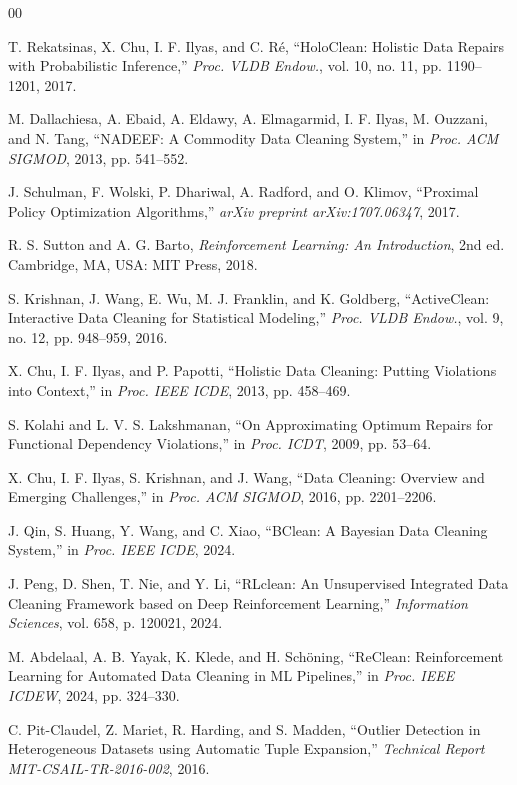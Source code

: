 \documentclass[sigconf]{acmart}
\begin{document}
\begin{thebibliography}{00}

T. Rekatsinas, X. Chu, I. F. Ilyas, and C. R\'{e},
``HoloClean: Holistic Data Repairs with Probabilistic Inference,''
\textit{Proc. VLDB Endow.}, vol. 10, no. 11, pp. 1190--1201, 2017.

M. Dallachiesa, A. Ebaid, A. Eldawy, A. Elmagarmid, I. F. Ilyas, M. Ouzzani, and N. Tang,
``NADEEF: A Commodity Data Cleaning System,''
in \textit{Proc. ACM SIGMOD}, 2013, pp. 541--552.

J. Schulman, F. Wolski, P. Dhariwal, A. Radford, and O. Klimov,
``Proximal Policy Optimization Algorithms,''
\textit{arXiv preprint arXiv:1707.06347}, 2017.

R. S. Sutton and A. G. Barto,
\textit{Reinforcement Learning: An Introduction}, 2nd ed.
Cambridge, MA, USA: MIT Press, 2018.

S. Krishnan, J. Wang, E. Wu, M. J. Franklin, and K. Goldberg,
``ActiveClean: Interactive Data Cleaning for Statistical Modeling,''
\textit{Proc. VLDB Endow.}, vol. 9, no. 12, pp. 948--959, 2016.

X. Chu, I. F. Ilyas, and P. Papotti,
``Holistic Data Cleaning: Putting Violations into Context,''
in \textit{Proc. IEEE ICDE}, 2013, pp. 458--469.

S. Kolahi and L. V. S. Lakshmanan,
``On Approximating Optimum Repairs for Functional Dependency Violations,''
in \textit{Proc. ICDT}, 2009, pp. 53--64.

X. Chu, I. F. Ilyas, S. Krishnan, and J. Wang,
``Data Cleaning: Overview and Emerging Challenges,''
in \textit{Proc. ACM SIGMOD}, 2016, pp. 2201--2206.

J. Qin, S. Huang, Y. Wang, and C. Xiao,
``BClean: A Bayesian Data Cleaning System,''
in \textit{Proc. IEEE ICDE}, 2024.

J. Peng, D. Shen, T. Nie, and Y. Li,
``RLclean: An Unsupervised Integrated Data Cleaning Framework based on Deep Reinforcement Learning,''
\textit{Information Sciences}, vol. 658, p. 120021, 2024.

M. Abdelaal, A. B. Yayak, K. Klede, and H. Sch\"{o}ning,
``ReClean: Reinforcement Learning for Automated Data Cleaning in ML Pipelines,''
in \textit{Proc. IEEE ICDEW}, 2024, pp. 324--330.

C. Pit-Claudel, Z. Mariet, R. Harding, and S. Madden,
``Outlier Detection in Heterogeneous Datasets using Automatic Tuple Expansion,''
\textit{Technical Report MIT-CSAIL-TR-2016-002}, 2016.


\end{thebibliography}
\end{document}
